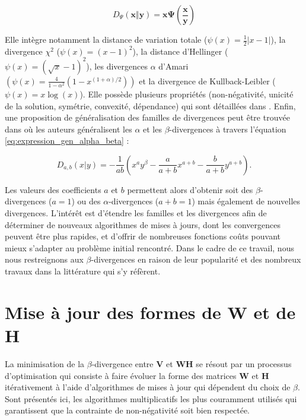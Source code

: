 \begin{equation}
D_{\Psi} (\mathbf{x} \Vert\mathbf{y}) = \mathbf{x} \mathbf{\Psi} \left( \frac{\mathbf{x}}{\mathbf{y}}\right)
\end{equation}

Elle intègre notamment la distance de variation totale ($\psi(x) = \frac{1}{2}\vert x-1 \vert $), la divergence $\chi^2$ ($\psi(x) = (x-1)^2$), la distance d'Hellinger ($\psi(x) = (\sqrt{x}-1)^2$), les divergences $\alpha$ d'Amari $(\psi(x) = \frac{4}{1-\alpha^2} \left(1-x^{(1+\alpha)/2} \right))$ et la divergence de Kullback-Leibler ($\psi(x) = x\log (x)$). Elle possède plusieurs propriétés (non-négativité, unicité de la solution, symétrie, convexité, dépendance) qui sont détaillées dans \cite{csiszar2004information}.
Enfin, une proposition de généralisation des familles de divergences peut être trouvée dans \cite{cichocki_generalized_2011} où les auteurs généralisent les $\alpha$ et les $\beta$-divergences à travers l'équation  \ref{eq:expression_gen_alpha_beta} : 

\begin{equation}\label{eq:expression_gen_alpha_beta}
D_{a, b}(x \vert y) = -\frac{1}{a b}\left(x^{a}y^{\beta}- \frac{a}{a+b}x^{a + b}-\frac{b}{a+b}y^{a+b} \right).
\end{equation}

Les valeurs des coefficients $a$ et $b$ permettent alors d'obtenir soit des $\beta$-divergences ($a = 1$) ou des $\alpha$-divergences ($a+b = 1$) mais également de nouvelles divergences. L'intérêt est d'étendre les familles et les divergences afin de déterminer de nouveaux algorithmes de mises à jours, dont les convergences peuvent être plus rapides, et d'offrir de nombreuses fonctions coûts pouvant mieux s'adapter au problème initial rencontré. Dans le cadre de ce travail, nous nous restreignons aux $\beta$-divergences en raison de leur popularité et des nombreux travaux dans la littérature qui s'y réfèrent.

\section{Mise à jour des formes de \textbf{W} et de \textbf{H}}

La minimisation de la $\beta$-divergence entre $\mathbf{V}$ et $\mathbf{WH}$ se résout par un processus d'optimisation qui consiste à faire évoluer la forme des matrices $\mathbf{W}$ et $\mathbf{H}$ itérativement à l'aide d'algorithmes de mises à jour qui dépendent du choix de $\beta$. 
Sont présentés ici, les algorithmes multiplicatifs les plus couramment utilisés qui garantissent que la contrainte de non-négativité soit bien respectée.


